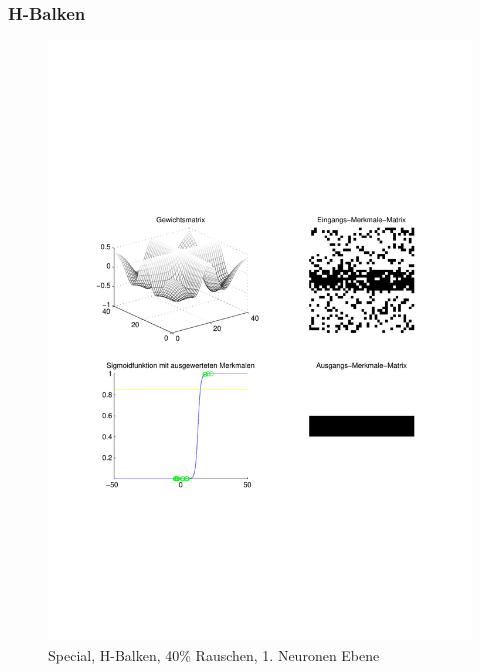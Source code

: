 \subsubsection{H-Balken}
\begin{figure}[hbt]
	\begin{minipage}{0.8 \textwidth}
		\includegraphics[width=\textwidth]{./Bilder/Auswertung/Endergebnis/TypeSpecial_Rauschen40_H_Line_Layer1}
		\caption{Special, H-Balken, 40\% Rauschen, 1. Neuronen Ebene}
		\label{Special_H_40_1}
	\end{minipage}
	\vfill
	\begin{minipage}{0.8 \textwidth}

\end{minipage}
\end{figure}
